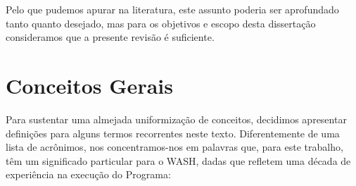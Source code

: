 \documentclass[
12pt,		%
openright,	%
twoside,  %
a4paper,			%
chapter=TITLE,		%
english,			%
french,				%
spanish,			%
brazil				%
]{USPSC-classe/USPSC}
\begin{document}
Pelo que pudemos apurar na literatura, este assunto poderia ser aprofundado tanto quanto desejado, mas para os objetivos e escopo desta disserta\c{c}\~ao consideramos que a presente revis\~ao \'e suficiente.









\section[Conceitos Gerais]{Conceitos Gerais}\label{Conceitos Gerais}
Para sustentar uma almejada uniformiza\c{c}\~ao de conceitos, decidimos apresentar defini\c{c}\~oes para alguns termos recorrentes neste texto. Diferentemente de uma lista de acr\^onimos, nos concentramos-nos em palavras que, para este trabalho, t\^em um significado particular para o  WASH, dadas que refletem uma d\'ecada de experi\^encia na execu\c{c}\~ao do Programa:
\end{document}
